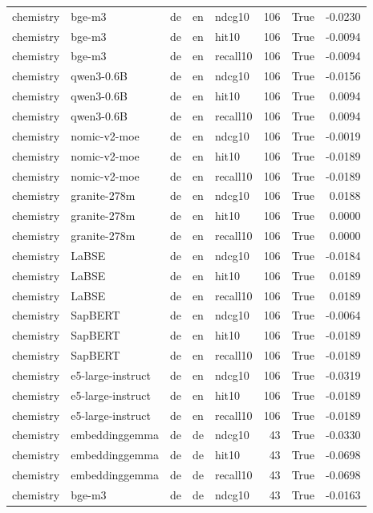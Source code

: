 \begin{tabular}{lllllrrr}
chemistry & bge-m3 & de & en & ndcg10 & 106 & True & -0.0230 \\
chemistry & bge-m3 & de & en & hit10 & 106 & True & -0.0094 \\
chemistry & bge-m3 & de & en & recall10 & 106 & True & -0.0094 \\
chemistry & qwen3-0.6B & de & en & ndcg10 & 106 & True & -0.0156 \\
chemistry & qwen3-0.6B & de & en & hit10 & 106 & True & 0.0094 \\
chemistry & qwen3-0.6B & de & en & recall10 & 106 & True & 0.0094 \\
chemistry & nomic-v2-moe & de & en & ndcg10 & 106 & True & -0.0019 \\
chemistry & nomic-v2-moe & de & en & hit10 & 106 & True & -0.0189 \\
chemistry & nomic-v2-moe & de & en & recall10 & 106 & True & -0.0189 \\
chemistry & granite-278m & de & en & ndcg10 & 106 & True & 0.0188 \\
chemistry & granite-278m & de & en & hit10 & 106 & True & 0.0000 \\
chemistry & granite-278m & de & en & recall10 & 106 & True & 0.0000 \\
chemistry & LaBSE & de & en & ndcg10 & 106 & True & -0.0184 \\
chemistry & LaBSE & de & en & hit10 & 106 & True & 0.0189 \\
chemistry & LaBSE & de & en & recall10 & 106 & True & 0.0189 \\
chemistry & SapBERT & de & en & ndcg10 & 106 & True & -0.0064 \\
chemistry & SapBERT & de & en & hit10 & 106 & True & -0.0189 \\
chemistry & SapBERT & de & en & recall10 & 106 & True & -0.0189 \\
chemistry & e5-large-instruct & de & en & ndcg10 & 106 & True & -0.0319 \\
chemistry & e5-large-instruct & de & en & hit10 & 106 & True & -0.0189 \\
chemistry & e5-large-instruct & de & en & recall10 & 106 & True & -0.0189 \\
chemistry & embeddinggemma & de & de & ndcg10 & 43 & True & -0.0330 \\
chemistry & embeddinggemma & de & de & hit10 & 43 & True & -0.0698 \\
chemistry & embeddinggemma & de & de & recall10 & 43 & True & -0.0698 \\
chemistry & bge-m3 & de & de & ndcg10 & 43 & True & -0.0163 \\

\end{tabular}
